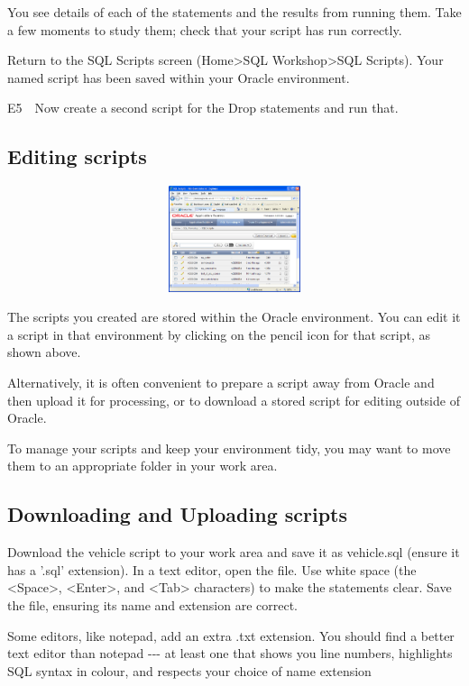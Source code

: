 You see details of each of the statements and the results from running them.  Take a few moments to study them; check that your script has run correctly.

Return to the SQL Scripts screen (Home{\textgreater}SQL Workshop{\textgreater}SQL Scripts).  Your named script has been saved within your Oracle environment.

E5\ \ Now create a second script for the Drop statements and run that.

\clearpage\subsection{Editing scripts}
   
\includegraphics[width=14.9cm,height=3.108cm]{images/img (45).png}
 

The scripts you created are stored within the Oracle environment.  You can edit it a script in that environment by clicking on the pencil icon for that script, as shown above.

Alternatively, it is often convenient to prepare a script away from Oracle and then upload it for processing, or to download a stored script for editing outside of Oracle.

To manage your scripts and keep your environment tidy, you may want to move them to an appropriate folder in your work area.

\subsection{}
\subsection{Downloading and Uploading scripts}
Download the vehicle script to your work area and save it as vehicle.sql (ensure it has a '.sql' extension). In a text editor, open the file. Use white space (the {\textless}Space{\textgreater}, {\textless}Enter{\textgreater}, and {\textless}Tab{\textgreater} characters) to make the statements clear. Save the file, ensuring its name and extension are correct.

Some editors, like notepad, add an extra .txt extension. You should find a better text editor than notepad -{}-{}- at least one that shows you line numbers, highlights SQL syntax in colour, and respects your choice of name extension

